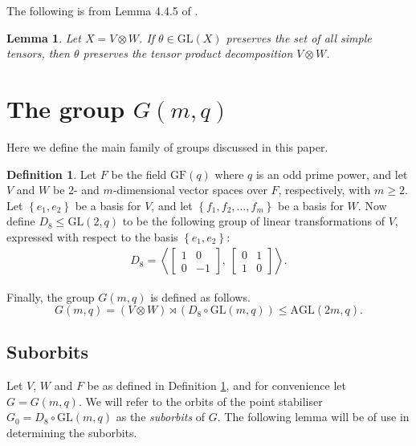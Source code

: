 \documentclass[10pt]{amsart}
\theoremstyle{definition}
\newtheorem{defi}[defi]{Definition}
\theoremstyle{plain}
\newtheorem{lemma}[lemma]{Lemma}
\theoremstyle{plain}
\theoremstyle{plain}
\theoremstyle{plain}
\newcommand{\AGL}{\mathrm{AGL}}
\newcommand{\GF}{\mathrm{GF}}
\newcommand{\GL}{\mathrm{GL}}
\begin{document}
The following is from Lemma 4.4.5 of \cite{ref:xu-aschbacher}.

\begin{lemma} \label{lm:preserves-simple-tensors-preserves-decomp}
Let $X = V \otimes W$. If $\theta \in \GL{\left(X \right)}$ preserves the set of all simple tensors, then $\theta$ preserves the tensor product decomposition $V \otimes W$.
\end{lemma}

\section{The group \texorpdfstring{$G{\left(m, q \right)}$}{G(m,q)}}

Here we define the main family of groups discussed in this paper.

\begin{defi} \label{def:G(m, q)}
Let $F$ be the field $\GF{\left(q \right)}$ where $q$ is an odd prime power, and let $V$ and $W$ be $2$- and $m$-dimensional vector spaces over $F$, respectively, with $m \geqslant 2$. Let $\left\{e_1, e_2 \right\}$ be a basis for $V$, and let $\left\{f_1, f_2, \ldots, f_m \right\}$ be a basis for $W$. Now define $D_8 \leqslant \GL{\left(2, q \right)}$ to be the following group of linear transformations of $V$, expressed with respect to the basis $\left\{e_1, e_2 \right\}$:
\begin{align}
D_8 = {\left<{\begin{bmatrix} 1 & 0 \\ 0 & -1 \end{bmatrix}},\ \begin{bmatrix} 0 & 1 \\ 1 & 0 \end{bmatrix} \right>}. \label{eqn:D_8}
\end{align}

Finally, the group $G{\left(m, q \right)}$ is defined as follows.
\begin{displaymath}
G{\left(m, q \right)} = \left(V \otimes W \right) \rtimes \left(D_8 \circ \GL{\left(m, q \right)}\right) \leqslant \AGL{\left(2m, q \right)}.
\end{displaymath}
\end{defi}

\subsection{Suborbits} \label{sc:suborbits}

Let $V$, $W$ and $F$ be as defined in Definition \ref{def:G(m, q)}, and for convenience let $G = G {\left(m, q \right)}$. We will refer to the orbits of the point stabiliser $G_0 = D_8 \circ \GL{\left(m, q \right)}$ as the \emph{suborbits} of $G$. The following lemma will be of use in determining the suborbits.
\end{document}
